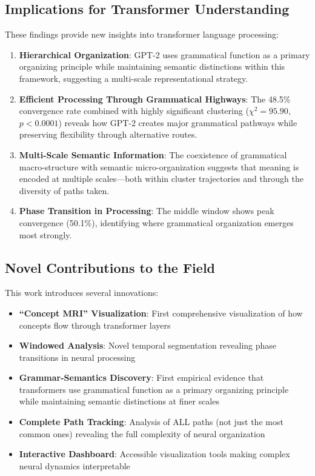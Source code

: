 \subsection{Implications for Transformer Understanding}

These findings provide new insights into transformer language processing:

\begin{enumerate}
    \item \textbf{Hierarchical Organization}: GPT-2 uses grammatical function as a primary organizing principle while maintaining semantic distinctions within this framework, suggesting a multi-scale representational strategy.
    
    \item \textbf{Efficient Processing Through Grammatical Highways}: The 48.5\% convergence rate combined with highly significant clustering ($\chi^2 = 95.90$, $p < 0.0001$) reveals how GPT-2 creates major grammatical pathways while preserving flexibility through alternative routes.
    
    \item \textbf{Multi-Scale Semantic Information}: The coexistence of grammatical macro-structure with semantic micro-organization suggests that meaning is encoded at multiple scales—both within cluster trajectories and through the diversity of paths taken.
    
    \item \textbf{Phase Transition in Processing}: The middle window shows peak convergence (50.1\%), identifying where grammatical organization emerges most strongly.
\end{enumerate}

\subsection{Novel Contributions to the Field}

This work introduces several innovations:

\begin{itemize}
    \item \textbf{``Concept MRI'' Visualization}: First comprehensive visualization of how concepts flow through transformer layers
    \item \textbf{Windowed Analysis}: Novel temporal segmentation revealing phase transitions in neural processing
    \item \textbf{Grammar-Semantics Discovery}: First empirical evidence that transformers use grammatical function as a primary organizing principle while maintaining semantic distinctions at finer scales
    \item \textbf{Complete Path Tracking}: Analysis of ALL paths (not just the most common ones) revealing the full complexity of neural organization
    \item \textbf{Interactive Dashboard}: Accessible visualization tools making complex neural dynamics interpretable
\end{itemize}

